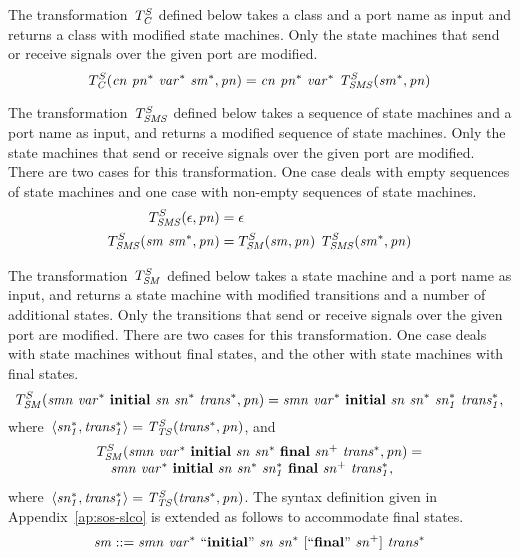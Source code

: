 The transformation~$T^S_{\it{C}}$ defined below takes a class and a port name as input and returns a class with modified state machines.
Only the state machines that send or receive signals over the given port are modified.
%
\[
T^S_{\it{C}}(\it{cn}~\it{pn^*}~\it{var^*}~\it{sm^*}, \it{pn}) = \it{cn}~\it{pn^*}~\it{var^*}~T^S_{\it{SMS}}(\it{sm^*}, \it{pn})
\]

The transformation~$T^S_{\it{SMS}}$ defined below takes a sequence of state machines and a port name as input, and returns a modified sequence of state machines.
Only the state machines that send or receive signals over the given port are modified.
There are two cases for this transformation.
One case deals with empty sequences of state machines and one case with non-empty sequences of state machines.
%
\begin{align*}
T^S_{\it{SMS}}(\epsilon, \it{pn}) & = \epsilon \\
T^S_{\it{SMS}}(\it{sm}~\it{sm^*}, \it{pn}) & = T^S_{\it{SM}}(\it{sm}, \it{pn})~T^S_{\it{SMS}}(\it{sm^*}, \it{pn})
\end{align*}

The transformation~$T^S_{\it{SM}}$ defined below takes a state machine and a port name as input, and returns a state machine with modified transitions and a number of additional states.
Only the transitions that send or receive signals over the given port are modified.
There are two cases for this transformation.
One case deals with state machines without final states, and the other with state machines with final states.
%
\[
T^S_{\it{SM}}(\it{smn}~\it{var^*}~\textbf{initial}~\it{sn}~\it{sn^*}~\it{trans^*}, \it{pn}) =  \it{smn}~\it{var^*}~\textbf{initial}~\it{sn}~\it{sn^*}~\it{sn^*_1}~\it{trans^*_1},
\]
where~$\langle \it{sn^*_1}, \it{trans^*_1} \rangle = T^S_{\it{TS}}(\it{trans^*}, \it{pn})$, and
\[
\begin{array}{l}
T^S_{\it{SM}}(\it{smn}~\it{var^*}~\textbf{initial}~\it{sn}~\it{sn^*}~\textbf{final}~\it{sn^+}~\it{trans^*}, \it{pn}) = \\
\quad \it{smn}~\it{var^*}~\textbf{initial}~\it{sn}~\it{sn^*}~\it{sn^*_1}~\textbf{final}~\it{sn^+}~\it{trans^*_1},
\end{array}
\]
where~$\langle \it{sn^*_1}, \it{trans^*_1} \rangle = T^S_{\it{TS}}(\it{trans^*}, \it{pn})$.
The syntax definition given in Appendix~\ref{ap:sos-slco} is extended as follows to accommodate final states.
%
\[
\it{sm} ::= \it{smn}~\it{var^*}~``\textbf{initial}"~\it{sn}~\it{sn^*}~[``\textbf{final}"~\it{sn^+}]~\it{trans^*}
\]


